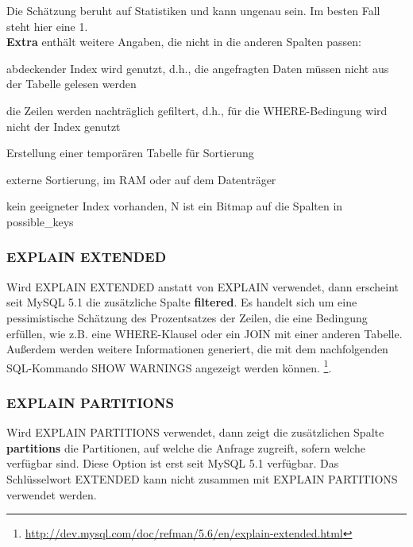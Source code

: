 Die Schätzung beruht auf Statistiken und kann ungenau sein. Im besten Fall steht hier eine 1.\\
\textbf{Extra} enthält weitere Angaben, die nicht in die anderen Spalten passen:
\begin{description}[font=\ttfamily]
\item[Using Index] abdeckender Index wird genutzt, d.h., die angefragten Daten müssen nicht aus der Tabelle gelesen werden
\item[Using where] die Zeilen werden nachträglich gefiltert, d.h., für die WHERE-Bedingung wird nicht der Index genutzt
\item[Using temporary] Erstellung einer temporären Tabelle für Sortierung 
\item[Using filesort] externe Sortierung, im RAM oder auf dem Datenträger
\item[ranke checked for each record (index map: N)] kein geeigneter Index vorhanden, N ist ein Bitmap auf die Spalten in possible\_keys
\end{description}
\subsubsection{EXPLAIN EXTENDED}
Wird EXPLAIN EXTENDED anstatt von EXPLAIN verwendet, dann erscheint seit MySQL 5.1 die zusätzliche Spalte \textbf{filtered}. Es handelt sich um eine pessimistische Schätzung des Prozentsatzes der Zeilen, die eine Bedingung erfüllen, wie z.B. eine WHERE-Klausel oder ein JOIN mit einer anderen Tabelle.
Außerdem werden weitere Informationen generiert, die mit dem nachfolgenden SQL-Kommando SHOW WARNINGS angezeigt werden können.  \footnote{\cite{manual} \url{http://dev.mysql.com/doc/refman/5.6/en/explain-extended.html}}.
\subsubsection{EXPLAIN PARTITIONS}
Wird EXPLAIN PARTITIONS verwendet, dann zeigt die zusätzlichen Spalte \textbf{partitions} die Partitionen, auf welche die Anfrage zugreift, sofern welche verfügbar sind. Diese Option ist erst seit MySQL 5.1 verfügbar.
Das Schlüsselwort EXTENDED kann nicht zusammen mit EXPLAIN PARTITIONS verwendet werden.
